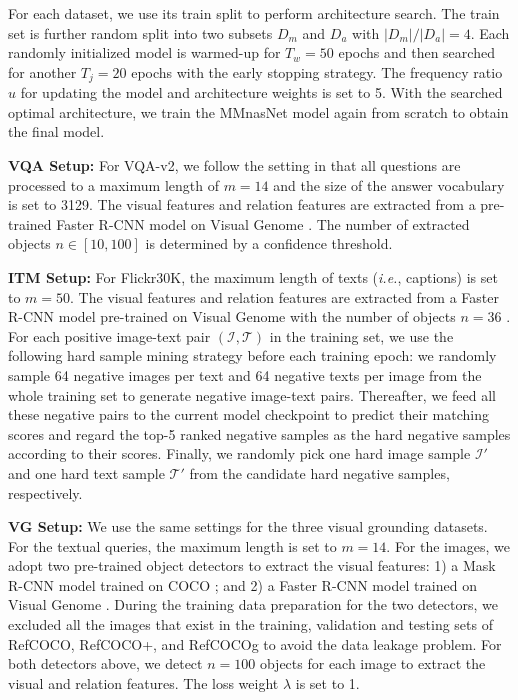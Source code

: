 \documentclass[sigconf]{acmart}
\begin{document}
For each dataset, we use its train split to perform architecture search. The train set is further random split into two subsets $D_m$ and $D_a$ with $|D_m|/|D_a|=4$. Each randomly initialized model is warmed-up for $T_w=50$ epochs and then searched for another $T_j=20$ epochs with the early stopping strategy.
The frequency ratio $u$ for updating the model and architecture weights is set to 5. With the searched optimal architecture, we train the MMnasNet model again from scratch to obtain the final model.


\noindent\textbf{VQA Setup:} For VQA-v2, we follow the setting in \cite{yu2019mcan} that all questions are processed to a maximum length of $m=14$ and the size of the answer vocabulary is set to 3129.  The visual features and relation features are extracted from a pre-trained Faster R-CNN model on Visual Genome \cite{anderson2017up-down}. The number of extracted objects $n\in[10,100]$ is determined by a confidence threshold.


\noindent\textbf{ITM Setup:} For Flickr30K, the maximum length of texts (\emph{i.e.}, captions) is set to $m=50$. The visual features and relation features are extracted from a Faster R-CNN model pre-trained on Visual Genome with the number of objects $n=36$ \cite{anderson2017up-down}. For each positive image-text pair $(\mathcal{I}, \mathcal{T})$ in the training set, we use the following hard sample mining strategy before each training epoch: we randomly sample 64 negative images per text and 64 negative texts per image from the whole training set to generate negative image-text pairs. Thereafter, we feed all these negative pairs to the current model checkpoint to predict their matching scores and regard the top-5 ranked negative samples as the hard negative samples according to their scores. Finally, we randomly pick one hard image sample $\mathcal{I'}$ and one hard text sample $\mathcal{T'}$ from the candidate hard negative samples, respectively.

\noindent\textbf{VG Setup:} We use the same settings for the three visual grounding datasets. For the textual queries, the maximum length is set to $m=14$. For the images, we adopt two pre-trained object detectors to extract the visual features: 1) a Mask R-CNN model trained on COCO \cite{he2017mask}; and 2) a Faster R-CNN model trained on Visual Genome \cite{ren2015faster}. During the training data preparation for the two detectors, we excluded all the images that exist in the training, validation and testing sets of RefCOCO, RefCOCO+, and RefCOCOg to avoid the data leakage problem. For both detectors above, we detect $n=100$ objects for each image to extract the visual and relation features. The loss weight $\lambda$ is set to 1.
\end{document}
